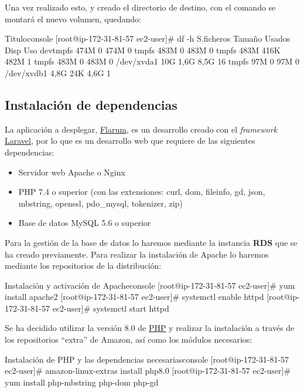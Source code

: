 \documentclass{\ClassPath/viu-tfm-template}
\begin{document}
Una vez realizado esto, y creado el directorio de destino, con el comando  se montará el nuevo volumen, quedando:

\begin{mycode}{Titulo}{console}{}
[root@ip-172-31-81-57 ec2-user]# df -h
S.ficheros     Tamaño Usados  Disp Uso%
devtmpfs         474M      0  474M   0%
tmpfs            483M      0  483M   0%
tmpfs            483M   416K  482M   1%
tmpfs            483M      0  483M   0%
/dev/xvda1        10G   1,6G  8,5G  16%
tmpfs             97M      0   97M   0%
/dev/xvdb1       4,8G    24K  4,6G   1%
\end{mycode}


\subsection{Instalación de dependencias}
La aplicación a desplegar, \href{https://flarum.org/}{Flarum}, es un desarrollo creado con el \textit{framework} \href{https://laravel.com/}{Laravel}, por lo que es un desarrollo web que requiere de las siguientes dependencias:

\begin{itemize}
    \item Servidor web Apache o Nginx
    \item PHP 7.4 o superior (con las extensiones: curl, dom, fileinfo, gd, json, mbstring, openssl, pdo\_mysql, tokenizer, zip)
    \item Base de datos MySQL 5.6 o superior
\end{itemize}

Para la gestión de la base de datos lo haremos mediante la instancia \textbf{RDS} que se ha creado previamente. Para realizar la instalación de Apache lo haremos mediante los repositorios de la distribución:

\begin{mycode}{Instalación y activación de Apache}{console}{}
[root@ip-172-31-81-57 ec2-user]# yum install apache2
[root@ip-172-31-81-57 ec2-user]# systemctl enable httpd
[root@ip-172-31-81-57 ec2-user]# systemctl start httpd
\end{mycode}

Se ha decidido utilizar la versión 8.0 de \href{https://www.php.net/}{PHP} y realizar la instalación a través de los repositorios “extra” de Amazon, así como los módulos necesarios:

\begin{mycode}{Instalación de PHP y las dependencias necesarias}{console}{{\small }}
[root@ip-172-31-81-57 ec2-user]# amazon-linux-extras install php8.0
[root@ip-172-31-81-57 ec2-user]# yum install php-mbstring php-dom php-gd
\end{mycode}
\end{document}
